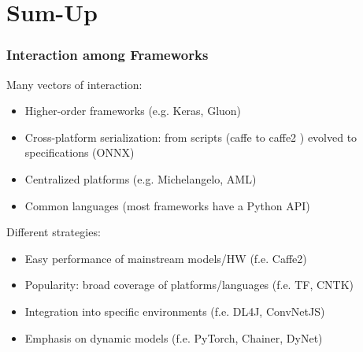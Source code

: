 \documentclass[hyperref={pdfpagelabels=false}]{beamer}
\begin{document}
     \section{Sum-Up}
     \frame{\sectionpage}

     \begin{frame}
       \frametitle{Interaction among Frameworks}
       Many vectors of interaction:
       \begin{itemize}[<.->]
       \item \normalsize{Higher-order frameworks (e.g. Keras, Gluon)}
       \item \normalsize{Cross-platform serialization: from scripts (caffe to caffe2 \cite{caffe-to-caffe2}) evolved to specifications (ONNX\cite{onnx-v1})}
       \item \normalsize{Centralized platforms (e.g. Michelangelo, AML)}
       \item \normalsize{Common languages (most frameworks have a Python API)}
       \end{itemize}
       \vspace{5mm}
       Different strategies:
       \begin{itemize}[<.->]
       \item \normalsize{Easy performance of mainstream models/HW (f.e. Caffe2)}
       \item \normalsize{Popularity: broad coverage of platforms/languages (f.e. TF, CNTK)}
       \item \normalsize{Integration into specific environments (f.e. DL4J, ConvNetJS)}
       \item \normalsize{Emphasis on dynamic models (f.e. PyTorch, Chainer, DyNet)}
       \end{itemize}
     \end{frame}
\end{document}
